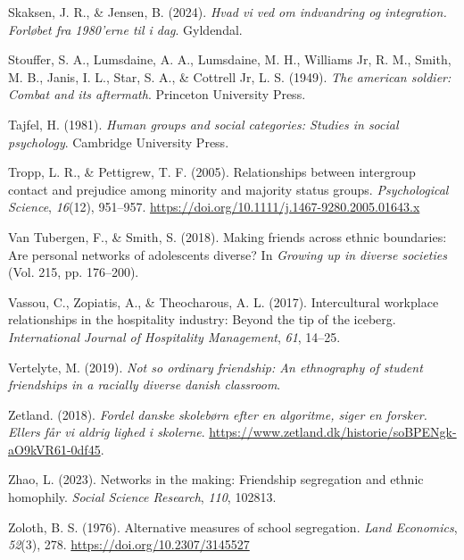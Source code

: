 \documentclass[
]{book}
\newlength{\cslhangindent}
\newenvironment{CSLReferences}[2] %
 {\begin{list}{}{%
  \setlength{\itemindent}{0pt}
  \setlength{\leftmargin}{0pt}
  \setlength{\parsep}{0pt}
  \ifodd #1
   \setlength{\leftmargin}{\cslhangindent}
   \setlength{\itemindent}{-1\cslhangindent}
  \fi
  \setlength{\itemsep}{#2\baselineskip}}}
 {\end{list}}
\begin{document}
\begin{CSLReferences}{1}{0}
Skaksen, J. R., \& Jensen, B. (2024). \emph{Hvad vi ved om indvandring og integration. Forløbet fra 1980'erne til i dag}. Gyldendal.

Stouffer, S. A., Lumsdaine, A. A., Lumsdaine, M. H., Williams Jr, R. M., Smith, M. B., Janis, I. L., Star, S. A., \& Cottrell Jr, L. S. (1949). \emph{The american soldier: Combat and its aftermath}. Princeton University Press.

Tajfel, H. (1981). \emph{Human groups and social categories: Studies in social psychology}. Cambridge University Press.

Tropp, L. R., \& Pettigrew, T. F. (2005). Relationships between intergroup contact and prejudice among minority and majority status groups. \emph{Psychological Science}, \emph{16}(12), 951--957. \url{https://doi.org/10.1111/j.1467-9280.2005.01643.x}

Van Tubergen, F., \& Smith, S. (2018). Making friends across ethnic boundaries: Are personal networks of adolescents diverse? In \emph{Growing up in diverse societies} (Vol. 215, pp. 176--200).

Vassou, C., Zopiatis, A., \& Theocharous, A. L. (2017). Intercultural workplace relationships in the hospitality industry: Beyond the tip of the iceberg. \emph{International Journal of Hospitality Management}, \emph{61}, 14--25.

Vertelyte, M. (2019). \emph{Not so ordinary friendship: An ethnography of student friendships in a racially diverse danish classroom}.

Zetland. (2018). \emph{Fordel danske skolebørn efter en algoritme, siger en forsker. Ellers får vi aldrig lighed i skolerne}. \url{https://www.zetland.dk/historie/soBPENgk-aO9kVR61-0df45}.

Zhao, L. (2023). Networks in the making: Friendship segregation and ethnic homophily. \emph{Social Science Research}, \emph{110}, 102813.

Zoloth, B. S. (1976). Alternative measures of school segregation. \emph{Land Economics}, \emph{52}(3), 278. \url{https://doi.org/10.2307/3145527}

\end{CSLReferences}
\end{document}
